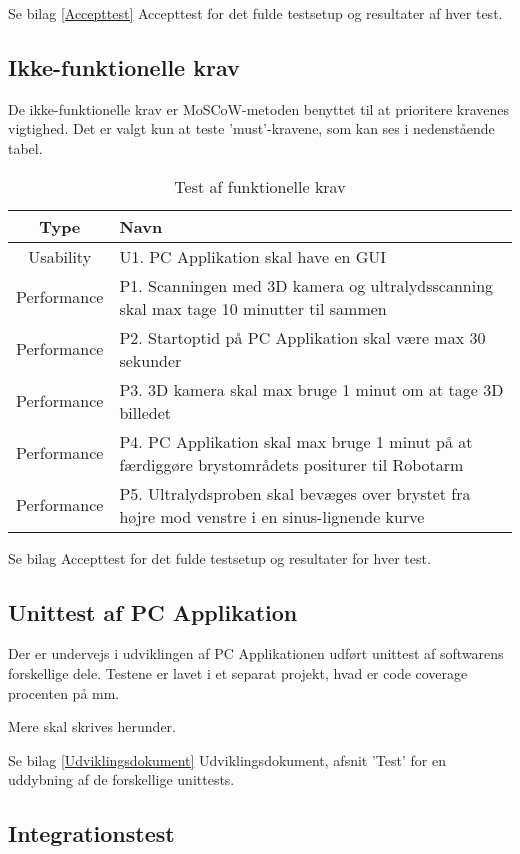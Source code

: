 Se bilag \ref{Accepttest} Accepttest for det fulde testsetup og resultater af hver test. 

\subsection{Ikke-funktionelle krav} 
De ikke-funktionelle krav er MoSCoW-metoden benyttet til at prioritere kravenes vigtighed. Det er valgt kun at teste ’must’-kravene, som kan ses i nedenstående tabel. 

\begin{table}[htb]
\centering
\begin{tabular}{ | c | p{} | }
\hline
\textbf{Type} & \textbf{Navn} \\\hline
Usability & U1. PC Applikation skal have en GUI \\\hline 
Performance & P1. Scanningen med 3D kamera og ultralydsscanning skal max tage 10
minutter til sammen \\\hline 
Performance & P2. Startoptid på PC Applikation skal være max 30 sekunder \\\hline
Performance & P3. 3D kamera skal max bruge 1 minut om at tage 3D billedet \\\hline 
Performance & P4. PC Applikation skal max bruge 1 minut på at færdiggøre brystområdets
positurer til Robotarm \\\hline 
Performance & P5. Ultralydsproben skal bevæges over brystet fra højre mod venstre i en
sinus-lignende kurve \\\hline 
\end{tabular}
\caption{Test af funktionelle krav}
\end{table}

Se bilag Accepttest for det fulde testsetup og resultater for hver test. 

\subsection{Unittest af PC Applikation}
Der er undervejs i udviklingen af PC Applikationen udført unittest af softwarens forskellige dele. 
Testene er lavet i et separat projekt, hvad er code coverage procenten på mm. 

Mere skal skrives herunder. 

Se bilag \ref{Udviklingsdokument} Udviklingsdokument, afsnit 'Test' for en uddybning af de forskellige unittests. 

\subsection{Integrationstest}
